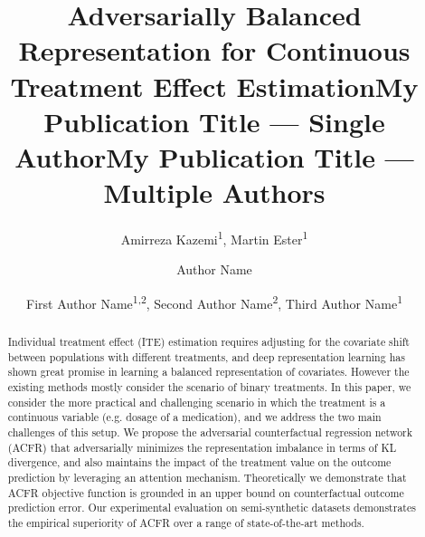 \documentclass[letterpaper]{article} %
\title{Adversarially Balanced Representation for Continuous Treatment Effect Estimation}
\author{
    Amirreza Kazemi\textsuperscript{\rm 1}, Martin Ester\textsuperscript{\rm 1}
}
\title{My Publication Title --- Single Author}
\author {
    Author Name
}
\title{My Publication Title --- Multiple Authors}
\author {
    First Author Name\textsuperscript{\rm 1,\rm 2},
    Second Author Name\textsuperscript{\rm 2},
    Third Author Name\textsuperscript{\rm 1}
}
\begin{document}
\maketitle

\begin{abstract}
Individual treatment effect (ITE) estimation requires adjusting for the covariate shift between populations with different treatments, and deep representation learning has shown great promise in learning a balanced representation of covariates. However the existing methods mostly consider the scenario of binary treatments. In this paper, we consider the more practical and challenging scenario in which the treatment is a continuous variable (e.g. dosage of a medication), and we address the two main challenges of this setup. We propose the adversarial counterfactual regression network (ACFR) that adversarially minimizes the representation imbalance in terms of KL divergence, and also maintains the impact of the treatment value on the outcome prediction by leveraging an attention mechanism. 
Theoretically we demonstrate that ACFR objective function is grounded in an upper bound on counterfactual outcome prediction error. 
Our experimental evaluation on semi-synthetic datasets demonstrates the empirical superiority of ACFR over a range of state-of-the-art methods.
\end{abstract}
\end{document}
